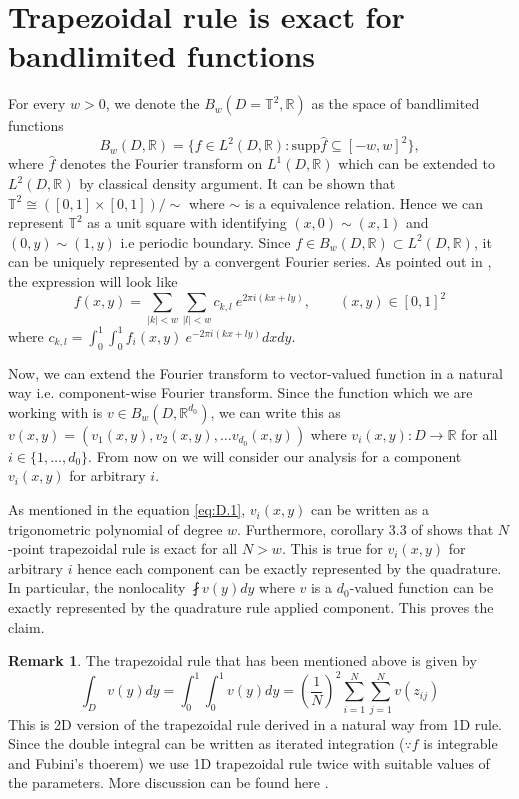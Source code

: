 \documentclass[reqno,10pt]{amsart}
\theoremstyle{plain}
\theoremstyle{definition}
\newtheorem{rem}{Remark}
\newcommand{\bb}[1]{\mathbb{#1}}
\begin{document}
    \section{\bf Trapezoidal rule is exact for bandlimited functions} \label{appendix:trapezoidal} %
    \noindent For every $w > 0$, we denote the $B_w(D=\bb T^2, \bb R)$ as the space of bandlimited functions
    $$ B_w(D,\bb R) = \{f \in L^2(D, \bb R) : \text{supp}\hat{f} \subseteq [-w,w]^2\},$$
    where $\hat{f}$ denotes the Fourier transform on $L^1(D, \bb R)$ which can be extended to $L^2(D, \bb R)$ by classical density argument. It can be shown that $\bb T^2 \cong ([0,1]\times[0,1])/\sim$ where $\sim$ is a equivalence relation. Hence we can represent $\bb T^2$ as a unit square with identifying $(x,0) \sim (x,1)$ and $(0,y) \sim (1,y)$ i.e periodic boundary. Since $f\in B_w(D,\bb R) \subset L^2(D,\bb R)$, it can be uniquely represented by a convergent Fourier series. As pointed out in \cite{RB2003}, the expression will look like
    \begin{equation}\label{eq:D.1}
        f(x,y) = \sum_{|k|< w} \sum_{|l| < w} c_{k,l}~e^{2\pi i (kx+ly)}, \qquad (x,y) \in [0,1]^2 
    \end{equation}
    where $c_{k,l}= \int_{0}^{1}\int_{0}^{1} f_i(x,y)~e^{-2\pi i (kx+ly)} dx dy$.

    \noindent Now, we can extend the Fourier transform to vector-valued function in a natural way i.e. component-wise Fourier transform. Since the function which we are working with is $v \in B_w(D,\bb R^{d_0})$, we can write this as $v(x,y) = (v_1(x,y),v_2(x,y), \dots v_{d_0}(x,y))$ where $v_i(x,y) : D \to \bb R$ for all $i \in \{1, \dots , d_0\}$. From now on we will consider our analysis for a component $v_i(x,y)$ for arbitrary $i$. 

    \noindent As mentioned in the equation \ref{eq:D.1}, $v_i(x,y)$ can be written as a trigonometric polynomial of degree $w$. Furthermore, corollary 3.3 of \cite{LT2014} shows that $N$-point trapezoidal rule is exact for all $N > w$. This is true for $v_i(x,y)$ for arbitrary $i$ hence each component can be exactly represented by the quadrature. In particular, the nonlocality $\fint v(y)dy$ where $v$ is a $d_0$-valued function can be exactly represented by the quadrature rule applied component. This proves the claim.
    \begin{rem}
        The trapezoidal rule that has been mentioned above is given by
        $$ \int_{D} v(y) dy = \int_{0}^{1} \int_{0}^{1} v(y) dy =  \left(\frac{1}{N}\right)^2 \sum_{i=1}^{N} \sum_{j=1}^{N} v(z_{ij})$$
    This is 2D version of the trapezoidal rule derived in a natural way from 1D rule. Since the double integral can be written as iterated integration ($\because f$ is integrable and Fubini's thoerem) we use 1D trapezoidal rule twice with suitable values of the parameters. More discussion can be found here \cite{kth2013}.
    \end{rem}



\end{document}
